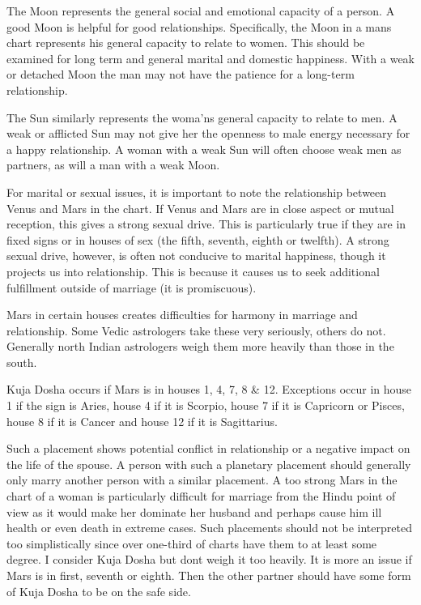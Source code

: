  

The Moon represents the general social and emotional capacity of a person. A good Moon is helpful for good relationships. Specifically, the Moon in a mans chart represents his general capacity to relate to women. This should be examined for long term and general marital and domestic happiness. With a weak or detached Moon the man may not have the patience for a long-term relationship.

 

The Sun similarly represents the woma’ns general capacity to relate to men. A weak or afflicted Sun may not give her the openness to male energy necessary for a happy relationship. A woman with a weak Sun will often choose weak men as partners, as will a man with a weak Moon.

 


 

For marital or sexual issues, it is important to note the relationship between Venus and Mars in the chart. If Venus and Mars are in close aspect or mutual reception, this gives a strong sexual drive. This is particularly true if they are in fixed signs or in houses of sex (the fifth, seventh, eighth or twelfth). A strong sexual drive, however, is often not conducive to marital happiness, though it projects us into relationship. This is because it causes us to seek additional fulfillment outside of marriage (it is promiscuous).

 


 

Mars in certain houses creates difficulties for harmony in marriage and relationship. Some Vedic astrologers take these very seriously, others do not. Generally north Indian astrologers weigh them more heavily than those in the south.

 

Kuja Dosha occurs if Mars is in houses 1, 4, 7, 8 & 12.
Exceptions occur in house 1 if the sign is Aries, house 4 if it is Scorpio, house 7 if it is Capricorn or Pisces, house 8 if it is Cancer and house 12 if it is Sagittarius.
 

Such a placement shows potential conflict in relationship or a negative impact on the life of the spouse. A person with such a planetary placement should generally only marry another person with a similar placement. A too strong Mars in the chart of a woman is particularly difficult for marriage from the Hindu point of view as it would make her dominate her husband and perhaps cause him ill health or even death in extreme cases. Such placements should not be interpreted too simplistically since over one-third of charts have them to at least some degree. I consider Kuja Dosha but dont weigh it too heavily. It is more an issue if Mars is in first, seventh or eighth. Then the other partner should have some form of Kuja Dosha to be on the safe side.


